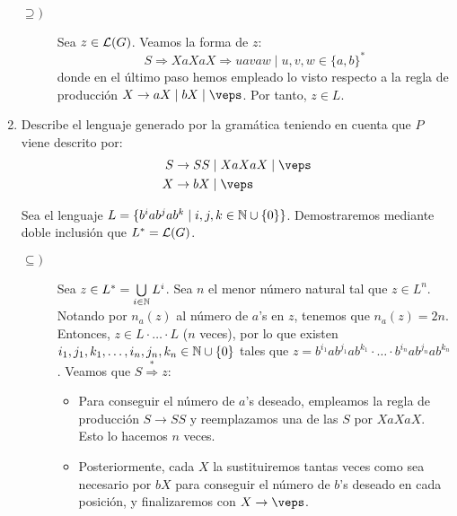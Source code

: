 \begin{ejercicio}
\begin{enumerate}
\begin{description}
            \item[$\supseteq)$] Sea $z\in\mathcal{L}(G)$. Veamos la forma de $z$:
            \begin{equation*}
                S \Longrightarrow XaXaX \Longrightarrow uavaw \mid u,v,w\in\{a,b\}^\ast
            \end{equation*}
            donde en el último paso hemos empleado lo visto respecto a la regla de producción $X\rightarrow aX \mid bX \mid \veps$. Por tanto, $z\in L$.
        \end{description}

        \item Describe el lenguaje generado por la gramática teniendo en cuenta que $P$ viene descrito por:
        \begin{align*}
            S &\rightarrow SS \mid XaXaX \mid \veps \\
            X &\rightarrow bX \mid \veps
        \end{align*}

        Sea el lenguaje $L=\{b^i a b^j a b^k \mid i,j,k\in \mathbb{N}\cup \{0\}\}$. Demostraremos mediante doble inclusión que $L^\ast=\mathcal{L}(G)$.
        \begin{description}
            \item[$\subseteq)$] Sea $z\in L^\ast=\bigcup\limits_{i\in \mathbb{N}} L^i$.
            Sea $n$ el menor número natural tal que $z\in L^n$.
            Notando por $n_a(z)$ al número de $a$'s en $z$, tenemos que $n_a(z)=2n$.
            Entonces, $z\in L\cdot \ldots \cdot L$ ($n$ veces), por lo que existen
            $i_1,j_1,k_1,\ldots,i_n,j_n,k_n\in \mathbb{N}\cup \{0\}$ tales que $z=b^{i_1} a b^{j_1} a b^{k_1} \cdot \ldots \cdot b^{i_n} a b^{j_n} a b^{k_n}$. Veamos que
            $S \stackrel{\ast}{\Longrightarrow} z$:
            \begin{itemize}
                \item Para conseguir el número de $a$'s deseado, empleamos la regla de producción $S \rightarrow SS$ y reemplazamos una de las $S$ por $XaXaX$. Esto lo hacemos $n$ veces.
                \item Posteriormente, cada $X$ la sustituiremos tantas veces como sea necesario por $bX$ para conseguir el número de $b$'s deseado en cada posición, y finalizaremos con $X\rightarrow \veps$.
            \end{itemize}


\end{description}
\end{enumerate}
\end{ejercicio}
